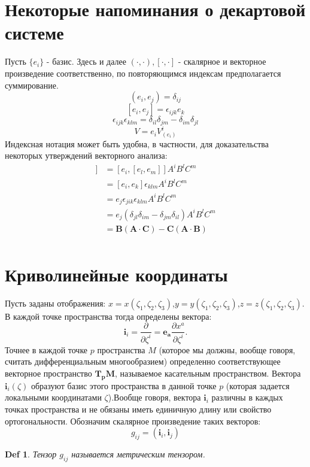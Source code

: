 \documentclass{article}
\newtheorem{defn}{Def}
\begin{document}
 	\section{Некоторые напоминания о декартовой системе} Пусть $\{e_i\}$ - базис. Здесь и далее $(\cdot, \cdot), [\cdot, \cdot]$ - скалярное и векторное произведение соответственно, по повторяющимся индексам предполагается суммирование.
 	$$(e_i, e_j)=\delta_{ij}$$
 	$$[e_i, e_j] = \epsilon_{ijk}e_k$$
 	$$\epsilon_{ijk}\epsilon_{klm} = \delta_{il}\delta_{jm} - \delta_{im}\delta_{jl}$$
 	$$V=e_i V^i_{(e_i)}$$
 	Индексная нотация может быть удобна, в частности, для доказательства некоторых утверждений векторного анализа:
 	\begin{align*}
 	[\mathbf{A}, [\mathbf{B},\mathbf{C}]] &= [e_i, [e_l, e_m]] A^i B^l C^m\\
 	&= [e_i, e_k] \epsilon_{klm} A^i B^l C^m \\
 	&= e_j \epsilon_{jik}\epsilon_{klm} A^i B^l C^m \\
 	&= e_j (\delta_{jl}\delta_{im} - \delta_{jm}\delta_{il}) A^i B^l C^m \\
 	&= \mathbf{B} (\mathbf{A}\cdot \mathbf{C}) - \mathbf{C} (\mathbf{A}\cdot \mathbf{B})\\
 	\end{align*}
 	\section{Криволинейные координаты}
 	Пусть заданы отображения: $x = x(\zeta_1, \zeta_2, \zeta_3)$,$y = y(\zeta_1, \zeta_2, \zeta_3)$,$z = z(\zeta_1, \zeta_2, \zeta_3)$.
 	В каждой точке пространства тогда определены вектора:
 	$$\mathbf{i}_i = \frac{\partial}{\partial \zeta^i} = \mathbf{e_a} \frac{\partial x^a}{\partial \zeta^i}.$$
 	Точнее в каждой точке $p$ пространства $M$ (которое мы должны, вообще говоря, считать дифференциальным многообразием) определенно соответствующее векторное пространство $\mathbf{T_p M}$, называемое касательным пространством. Вектора $\mathbf{i}_i (\zeta)$ образуют базис этого пространства в данной точке $p$ (которая задается локальными координатами $\zeta$).Вообще говоря, вектора $\mathbf{i}_i$ различны в каждых точках пространства и не обязаны иметь единичную длину или свойство ортогональности. Обозначим скалярное произведение таких векторов:
 	$$g_{ij} = (\mathbf{i}_i, \mathbf{i}_j)$$
 	\begin{defn}
 		Тензор $g_{ij}$ называется метрическим тензором.
 	\end{defn}
 	
\end{document}
